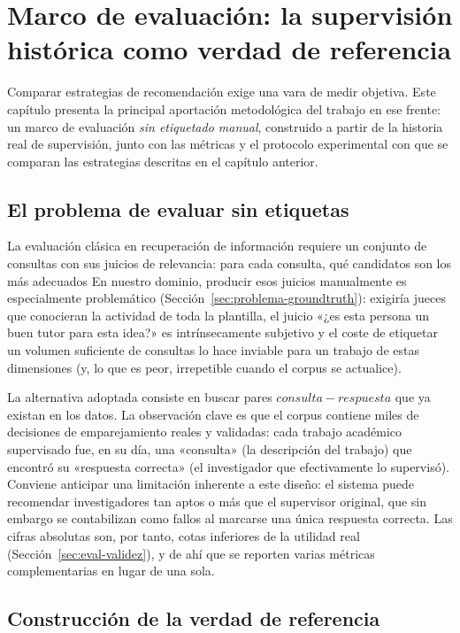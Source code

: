 \chapter[Marco de evaluación]{Marco de evaluación: la supervisión histórica como verdad de referencia}
\label{ch:evaluacion}

Comparar estrategias de recomendación exige una vara de medir objetiva.
Este capítulo presenta la principal aportación metodológica del trabajo en ese frente: un marco de evaluación \emph{sin etiquetado manual}, construido a partir de la historia real de supervisión, junto con las métricas y el protocolo experimental con que se comparan las estrategias descritas en el capítulo anterior.

\section{El problema de evaluar sin etiquetas}
\label{sec:eval-problema}

La evaluación clásica en recuperación de información requiere un conjunto de consultas con sus juicios de relevancia: para cada consulta, qué candidatos son los más adecuados
En nuestro dominio, producir esos juicios manualmente es especialmente problemático (Sección~\ref{sec:problema-groundtruth}): exigiría jueces que conocieran la actividad de toda la plantilla, el juicio «¿es esta persona un buen tutor para esta idea?» es intrínsecamente subjetivo y el coste de etiquetar un volumen suficiente de consultas lo hace inviable para un trabajo de estas dimensiones (y, lo que es peor, irrepetible cuando el corpus se actualice).

La alternativa adoptada consiste en buscar pares $consulta-respuesta$ que ya existan en los datos.
La observación clave es que el corpus contiene miles de decisiones de emparejamiento reales y validadas: cada trabajo académico supervisado fue, en su día, una «consulta» (la descripción del trabajo) que encontró su «respuesta correcta» (el investigador que efectivamente lo supervisó).
Conviene anticipar una limitación inherente a este diseño: el sistema puede recomendar investigadores tan aptos o más que el supervisor original, que sin embargo se contabilizan como fallos al marcarse una única respuesta correcta. Las cifras absolutas son, por tanto, cotas inferiores de la utilidad real (Sección~\ref{sec:eval-validez}), y de ahí que se reporten varias métricas complementarias en lugar de una sola.

\section{Construcción de la verdad de referencia}
\label{sec:eval-groundtruth}

